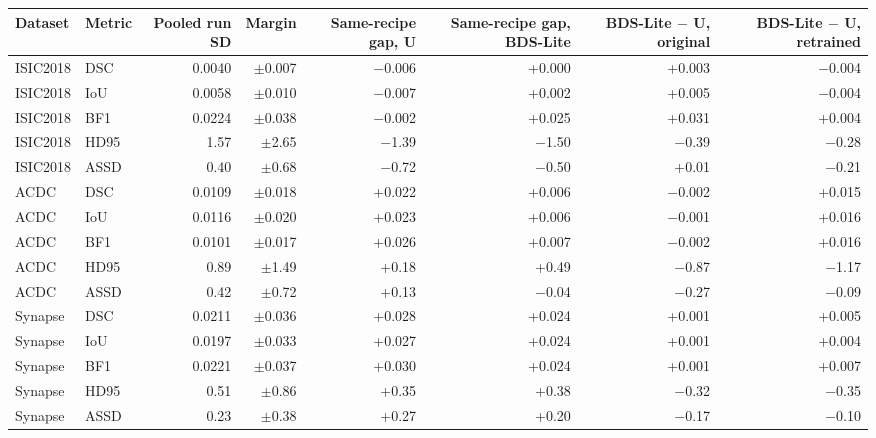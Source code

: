\begin{tabular}{llrrrrrr}
\toprule
Dataset & Metric & Pooled run SD & Margin & Same-recipe gap, U & Same-recipe gap, BDS-Lite & BDS-Lite $-$ U, original & BDS-Lite $-$ U, retrained \\
\midrule
ISIC2018 & DSC & 0.0040 & $\pm$0.007 & $-$0.006 & +0.000 & +0.003 & $-$0.004 \\
ISIC2018 & IoU & 0.0058 & $\pm$0.010 & $-$0.007 & +0.002 & +0.005 & $-$0.004 \\
ISIC2018 & BF1 & 0.0224 & $\pm$0.038 & $-$0.002 & +0.025 & +0.031 & +0.004 \\
ISIC2018 & HD95 & 1.57 & $\pm$2.65 & $-$1.39 & $-$1.50 & $-$0.39 & $-$0.28 \\
ISIC2018 & ASSD & 0.40 & $\pm$0.68 & $-$0.72 & $-$0.50 & +0.01 & $-$0.21 \\
\midrule
ACDC & DSC & 0.0109 & $\pm$0.018 & +0.022 & +0.006 & $-$0.002 & +0.015 \\
ACDC & IoU & 0.0116 & $\pm$0.020 & +0.023 & +0.006 & $-$0.001 & +0.016 \\
ACDC & BF1 & 0.0101 & $\pm$0.017 & +0.026 & +0.007 & $-$0.002 & +0.016 \\
ACDC & HD95 & 0.89 & $\pm$1.49 & +0.18 & +0.49 & $-$0.87 & $-$1.17 \\
ACDC & ASSD & 0.42 & $\pm$0.72 & +0.13 & $-$0.04 & $-$0.27 & $-$0.09 \\
\midrule
Synapse & DSC & 0.0211 & $\pm$0.036 & +0.028 & +0.024 & +0.001 & +0.005 \\
Synapse & IoU & 0.0197 & $\pm$0.033 & +0.027 & +0.024 & +0.001 & +0.004 \\
Synapse & BF1 & 0.0221 & $\pm$0.037 & +0.030 & +0.024 & +0.001 & +0.007 \\
Synapse & HD95 & 0.51 & $\pm$0.86 & +0.35 & +0.38 & $-$0.32 & $-$0.35 \\
Synapse & ASSD & 0.23 & $\pm$0.38 & +0.27 & +0.20 & $-$0.17 & $-$0.10 \\
\bottomrule
\end{tabular}
